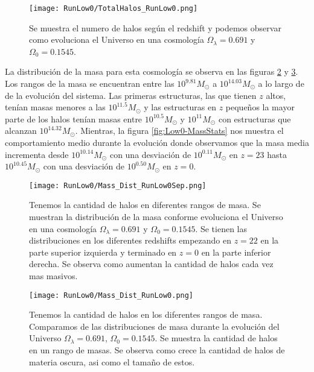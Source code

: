 \begin{figure}[H]
    \centering
    \texttt{[image: RunLow0/TotalHalos\_RunLow0.png]}
    \caption[Evolución del número de halos en un Universo $\Omega_\lambda = 0.691$, $\Omega_0 = 0.1545$]{\footnotesize Se muestra el numero de halos según el redshift y podemos observar como evoluciona el Universo en una cosmología $\Omega_\lambda = 0.691 $ y $\Omega_0 = 0.1545$.}
    \label{fig:Low0_TotalHalos}
\end{figure}

La distribución de la masa para esta cosmología se observa en las figuras \ref{fig:Low0-MassDistSep} y \ref{fig:Low0-MassDist}. Los rangos de la masa se encuentran entre las $10^{9.81}M_\odot$ a $10^{14.03}M_\odot$ a lo largo de de la evolución del sistema. Las primeras estructuras, las que tienen $z$ altos, tenían masas menores a las $10^{11.5}M_\odot$ y las estructuras en $z$ pequeños la mayor parte de los halos tenían masas entre $10^{10.5}M_\odot$ y $10^{11}M_\odot$ con estructuras que alcanzan $10^{14.32}M_\odot$. Mientras, la figura \ref{fig:Low0-MassStats} nos muestra el comportamiento medio durante la evolución donde observamos que la masa media incrementa desde $10^{10.14}M_\odot$ con una desviación de $10^{0.11}M_\odot$ en $z=23$ hasta $10^{10.45}M_\odot$ con una desviación de $10^{0.50}M_\odot$ en $z=0$.

\begin{figure}[H]
    \centering
    \texttt{[image: RunLow0/Mass\_Dist\_RunLow0Sep.png]}
    \caption[Distribución de masa]{\footnotesize Tenemos la cantidad de halos en diferentes rangos de masa. Se muestran la distribución de la masa conforme evoluciona el Universo en una cosmología $\Omega_\lambda = 0.691$ y $\Omega_0 = 0.1545$. Se tienen las distribuciones en los diferentes redshifts empezando en $z=22$ en la parte superior izquierda y terminado en $z=0$ en la parte inferior derecha. Se observa como aumentan la cantidad de halos cada vez mas masivos.}
    \label{fig:Low0-MassDistSep}
\end{figure}

\begin{figure}[H]
    \centering
    \texttt{[image: RunLow0/Mass\_Dist\_RunLow0.png]}
    \caption[Comparación de distribución de masa]{\footnotesize Tenemos la cantidad de halos en los diferentes rangos de masa. Comparamos de las distribuciones de masa durante la evolución del Universo $\Omega_\lambda = 0.691$, $\Omega_0 = 0.1545$. Se muestra la cantidad de halos en un rango de masas. Se observa como crece la cantidad de halos de materia oscura, asi como el tamaño de estos.}
    \label{fig:Low0-MassDist}
\end{figure}

